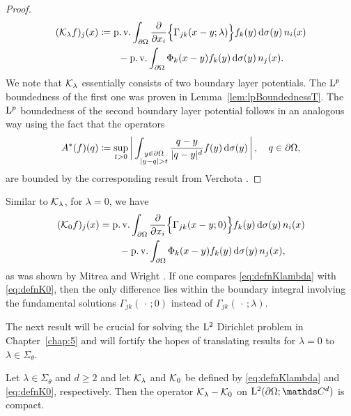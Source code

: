 \begin{proof}
\begin{align}
\begin{alignedat}{1}
    (\mathcal{K}_\lambda f)_j (x)
      &\coloneqq \operatorname{p. v.} \int_{\partial\Omega} \frac{\partial}{\partial x_i} \Big\{\Gamma_{jk}(x - y; \lambda) \Big\}  f_k(y) \, {\operatorname{d}\!{\sigma}}(y) \, n_i(x) \\
      &\qquad - \operatorname{p. v.} \int_{\partial\Omega} \Phi_k(x - y) f_k(y) \, {\operatorname{d}\!{\sigma}}(y)\, n_j(x).
    \end{alignedat}
  \end{align}
  We note that $\mathcal{K}_\lambda$ essentially consists of two boundary layer potentials. 
  The $\mathrm{L}^p$ boundedness of the first one was proven in Lemma~\ref{lem:lpBoundednessT}.
  The $\mathrm{L}^p$ boundedness of the second boundary layer potential follows in an analogous way using the fact that the operators
  \begin{align*}
    A^*(f)(q) \coloneqq \sup_{t > 0} \bigg| \int_{\substack{y \in \partial\Omega \\ |y - q| > t}} \frac{q - y}{|q - y|^d} f(y) \, {\operatorname{d}\!{\sigma}}(y)\, \bigg|\, , \quad q \in \partial\Omega,
  \end{align*}
  are bounded by the corresponding result from Verchota \cite[Lem.\@~1.2]{verchota}.
\end{proof}

Similar to $\mathcal{K}_\lambda$, for $\lambda = 0$, we have
\begin{align}
  \begin{alignedat}{1}
  \label{eq:defnK0}
    (\mathcal{K}_0 f)_j(x)&= \operatorname{p. v.} \int_{\partial\Omega} \frac{\partial}{\partial x_i} \Big\{ \Gamma_{jk}(x - y; 0) \Big\}  f_k(y) \, {\operatorname{d}\!{\sigma}}(y) \,n_i(x) \\
    &\qquad - \operatorname{p. v.} \int_{\partial\Omega} \Phi_k(x - y) f_k(y) \, {\operatorname{d}\!{\sigma}}(y)\, n_j(x),
  \end{alignedat}
\end{align}
as was shown by Mitrea and Wright \cite[Prop.\@~4.4]{mitreaWright}.
If one compares \eqref{eq:defnKlambda} with \eqref{eq:defnK0}, then the only difference lies within the boundary integral involving the fundamental solutions $\Gamma_{jk}(\,\cdot\,; 0)$ instead of $\Gamma_{jk}(\,\cdot\,; \lambda)$.

The next result will be crucial for solving the $\mathrm{L}^2$ Dirichlet problem in Chapter~\ref{chap:5} and will fortify the hopes of translating results for $\lambda = 0$ to $\lambda \in \Sigma_\theta$.
\begin{lem}
  \label{lem:compactness}
  Let $\lambda \in \Sigma_\theta$ and $d \geq 2$ and let $\mathcal{K}_\lambda$ and $\mathcal{K}_0$ be defined by \eqref{eq:defnKlambda} and \eqref{eq:defnK0}, respectively.
  Then the operator $\mathcal{K}_\lambda - \mathcal{K}_0$ on $\Ell^2(\partial\Omega; \C^d)$ is compact.
\end{lem}

